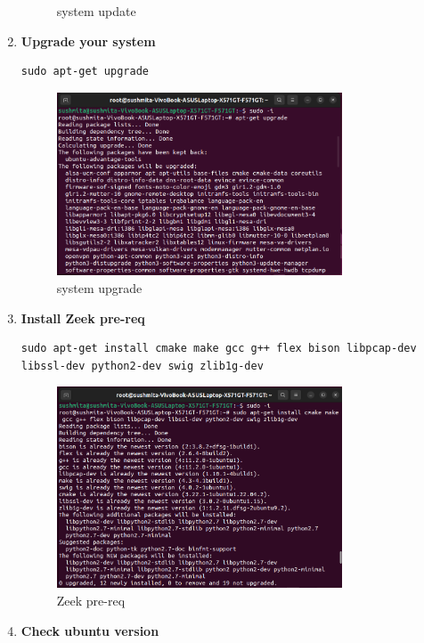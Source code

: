 \begin{enumerate}
\begin{figure}[H]
    \caption{system update}
\end{figure}
  \item \textbf{Upgrade your system}
    \begin{lstlisting}[style=bashstyle]
      sudo apt-get upgrade
    \end{lstlisting}
    \begin{figure}[H]
  \centering
  \includegraphics[width=0.8\textwidth]{images/install/3_apt_get_upgrade.png}
  \caption{system upgrade}
\end{figure}
  \item \textbf{Install Zeek pre-req}
    \begin{lstlisting}[style=bashstyle]
      sudo apt-get install cmake make gcc g++ flex bison libpcap-dev libssl-dev python2-dev swig zlib1g-dev
    \end{lstlisting}
    \begin{figure}[H]
  \centering
  \includegraphics[width=0.8\textwidth]{images/install/4_zeek_prereq_install.png}
  \caption{Zeek pre-req}
\end{figure}
\item \textbf{Check ubuntu version}
    \begin{lstlisting}[style=bashstyle]

\end{lstlisting}
\end{enumerate}
